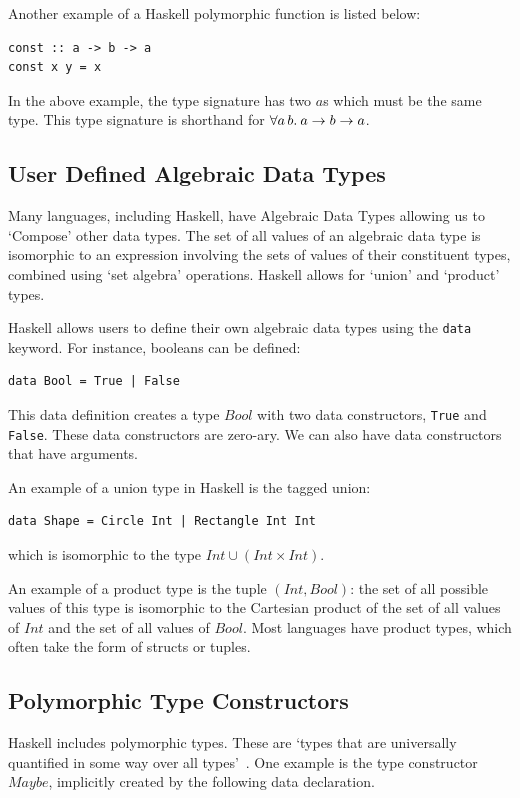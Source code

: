 Another example of a Haskell polymorphic function is listed below:
\begin{lstlisting}[language=SFL]
const :: a -> b -> a
const x y = x
\end{lstlisting}
\noindent In the above example, the type signature has two $a$s which must be the same type. This type signature is shorthand for $\forall a\, b.\: a \rightarrow b \rightarrow a$. 

\subsection{User Defined Algebraic Data Types}
\label{bg:haskell_udt}
Many languages, including Haskell, have Algebraic Data Types allowing us to `Compose' other data types. The set of all values of an algebraic data type is isomorphic to an expression involving the sets of values of their constituent types, combined using `set algebra' operations. Haskell allows for `union' and `product' types.  

Haskell allows users to define their own algebraic data types using the \lstinline[language=SFL]|data| keyword. For instance, booleans can be defined:

\begin{lstlisting}[language=SFL_noprelude]
data Bool = True | False
\end{lstlisting} 

\noindent This data definition creates a type $Bool$ with two data constructors, \verb|True| and \verb|False|. These data constructors are zero-ary. We can also have data constructors that have arguments. 

An example of a union type in Haskell is the tagged union:
\begin{lstlisting}[language=SFL]
data Shape = Circle Int | Rectangle Int Int
\end{lstlisting} 
\noindent which is isomorphic to the type \(Int \cup (Int \times Int)\). 

An example of a product type is the tuple \((Int, Bool)\): the set of all possible values of this type is isomorphic to the Cartesian product of the set of all values of \(Int\) and the set of all values of $Bool$. Most languages have product types, which often take the form of structs or tuples. 

\subsection{Polymorphic Type Constructors}
Haskell includes polymorphic types. These are `types that are universally quantified in some way over all types'~\cite{hudak1992gentle}. One example is the type constructor $Maybe$, implicitly created by the following data declaration.

